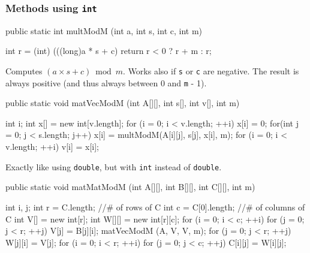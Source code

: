\subsubsection* {Methods using \texttt{int}}
\begin{code}

   public static int multModM (int a, int s, int c, int m) \begin{hide} {
      int r = (int) (((long)a * s + c) %
      return r < 0 ? r + m : r;
   } \end{hide}
\end{code}
\begin{tabb} Computes $(a \times s + c)
  \bmod m$. Works also if \texttt{s}
  or \texttt{c} are negative.
  The result is always positive (and thus always between 0 and \texttt{m} - 1).
\end{tabb}
\begin{htmlonly}
\end{htmlonly}
\begin{code}

   public static void matVecModM (int A[][], int s[], int v[], int m) \begin{hide} {
      int i;
      int x[] = new int[v.length];
      for (i = 0; i < v.length;  ++i) {
         x[i] = 0;
         for(int j = 0; j < s.length; j++)
            x[i] = multModM(A[i][j], s[j], x[i], m);
      }
      for (i = 0; i < v.length;  ++i)
         v[i] = x[i];

   } \end{hide}
\end{code}
\begin{tabb} Exactly like  using \texttt{double}, but with \texttt{int} instead
  of \texttt{double}.
\end{tabb}
\begin{htmlonly}
\end{htmlonly}
\begin{code}

   public static void matMatModM (int A[][], int B[][], int C[][], int m) \begin{hide} {
      int i, j;
      int r = C.length;    //# of rows of C
      int c = C[0].length; //# of columns of C
      int V[] = new int[r];
      int W[][] = new int[r][c];
      for (i = 0; i < c;  ++i) {
         for (j = 0; j < r;  ++j)
            V[j] = B[j][i];
         matVecModM (A, V, V, m);
         for (j = 0; j < r;  ++j)
            W[j][i] = V[j];
      }
      for (i = 0; i < r;  ++i) {
         for (j = 0; j < c;  ++j)
            C[i][j] = W[i][j];
      }
   } \end{hide}
\end{code}
